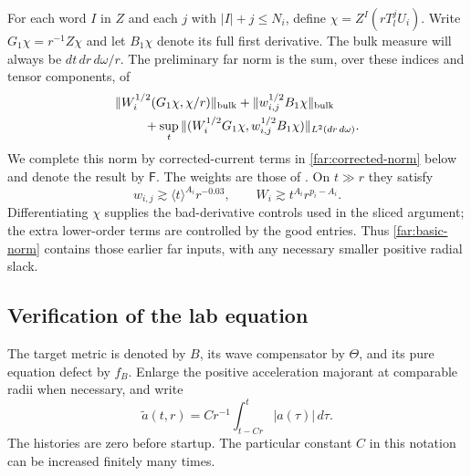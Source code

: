 For each word $I$ in $Z$ and each $j$ with $|I|+j\le N_i$, define
$\chi=Z^I(rT_l^jU_i)$.  Write $G_1\chi=r^{-1}Z\chi$ and let
$B_1\chi$ denote its full first derivative.  The bulk measure will always
be $dt\,dr\,d\omega/r$.  The preliminary far norm is the sum, over these
indices and tensor components, of
\begin{equation}\label{far:basic-norm}
 \begin{split}
 &\|W_i^{1/2}(G_1\chi,\chi/r)\|_{\mathrm{bulk}}
   +\|w_{i,j}^{1/2}B_1\chi\|_{\mathrm{bulk}}\\
 &\hspace{8mm}
   +\sup_t\|(W_i^{1/2}G_1\chi,w_{i,j}^{1/2}B_1\chi)
                                      \|_{L^2(dr\,d\omega)}.
 \end{split}
\end{equation}
We complete this norm by corrected-current terms in
\eqref{far:corrected-norm} below and denote the result by $\mathsf F$.
The weights are those of .  On $t\gg r$ they satisfy
\begin{equation}\label{far:timelike-weights}
 w_{i,j}\gtrsim\langle t\rangle^{A_i}r^{-0.03},
 \qquad W_i\gtrsim t^{A_i}r^{p_i-A_i}.
\end{equation}
Differentiating $\chi$ supplies the bad-derivative controls used in the
sliced argument; the extra lower-order terms are controlled by the good
entries.  Thus \eqref{far:basic-norm} contains those earlier far inputs,
with any necessary smaller positive radial slack.

\subsection{Verification of the lab equation}

The target metric is denoted by $B$, its wave compensator by $\Theta$,
and its pure equation defect by $f_B$.  Enlarge the positive acceleration
majorant at comparable radii when necessary, and write
\[
 \widetilde a(t,r)=Cr^{-1}\int_{t-Cr}^t|a(\tau)|\,d\tau.
\]
The histories are zero before startup.  The particular constant $C$ in
this notation can be increased finitely many times.

